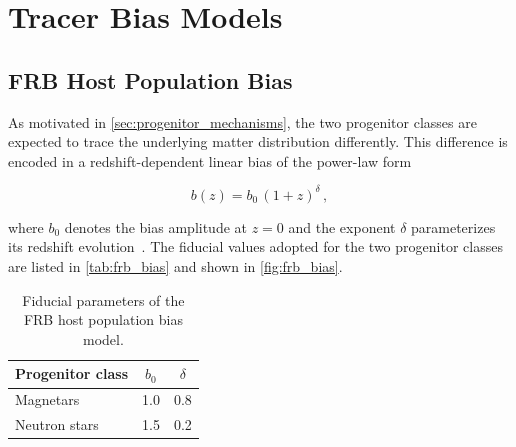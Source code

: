 \section{Tracer Bias Models} \label{sec:bias_models}

\subsection{FRB Host Population Bias} \label{sec:frb_bias}


As motivated in \autoref{sec:progenitor_mechanisms}, the two progenitor classes are expected
to trace the underlying matter distribution differently. 
This difference is encoded in a redshift-dependent linear bias of the power-law form

\begin{equation}\label{eq:frb_bias}
    b(z) = b_0 \, (1+z)^{\delta} \,,
\end{equation}

where $b_0$ denotes the bias amplitude at $z=0$ and the exponent $\delta$ parameterizes its redshift
evolution~\cite{Pan_2020}. The fiducial values adopted for the two progenitor classes are listed
in \autoref{tab:frb_bias} and shown in \autoref{fig:frb_bias}.

\begin{table}[H]
    \centering
    \vspace{-5pt} %
    \caption{Fiducial parameters of the FRB host population bias model.}
    \label{tab:frb_bias}
    \begin{tabular}{
        l@{\hspace{1.2em}}
        S[table-format=1.1]
        @{\hspace{1.0em}}
        S[table-format=1.1]
    }
        \toprule
        Progenitor class & {$b_0$} & {$\delta$} \\
        \midrule
        Magnetars      & 1.0 & 0.8 \\
        Neutron stars  & 1.5 & 0.2 \\
        \bottomrule
    \end{tabular}
\end{table}

